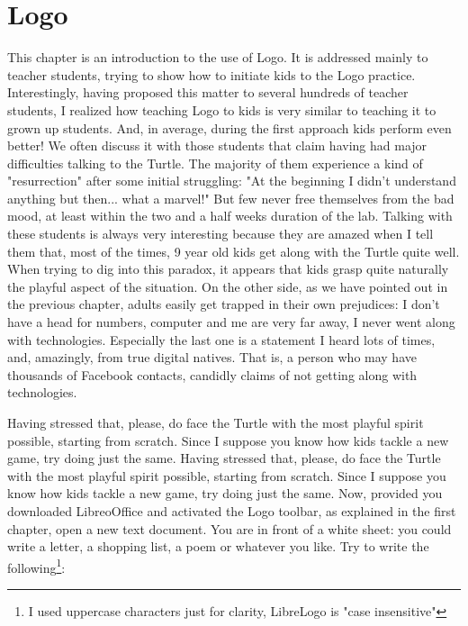 \chapter{Logo} \label{cap:papert2}

This chapter is an introduction to the use of Logo. It is addressed mainly to teacher students, trying to show how to initiate kids to the Logo practice. Interestingly, having proposed this matter to several hundreds of teacher students,  I realized how teaching Logo to kids is very similar to teaching it to grown up students. And, in average, during the first approach kids perform even better! We often discuss it with those students that claim having had major difficulties talking to the Turtle. The majority of them experience a kind of "resurrection" after some initial struggling: "At the beginning I didn't understand anything but then... what a marvel!"  But few never free themselves from the bad mood, at least within the two and a half weeks duration of the lab. Talking with these students is always very interesting because they are amazed when I tell them that, most of the times, 9 year old kids get along with the Turtle quite well. When trying to dig into this paradox, it appears that kids grasp quite naturally the playful aspect of the situation. On the other side, as we have pointed out in the previous chapter, adults easily get trapped in their own prejudices: I don't have a head for numbers, computer and me are very far away, I never went along with technologies. Especially the last one is a statement I heard lots of times, and, amazingly, from true digital natives. That is, a person who may have thousands of Facebook contacts, candidly claims of not getting along with technologies.

Having stressed that, please, do face the Turtle with the most playful spirit possible, starting from scratch. Since I suppose you know how kids tackle a new game, try doing just the same. Having stressed that, please, do face the Turtle with the most playful spirit possible, starting from scratch. Since I suppose you know how kids tackle a new game, try doing just the same.  Now, provided you downloaded LibreoOffice and activated the Logo toolbar, as explained in the first chapter, open a new text document. You are in front of a white sheet: you could write a letter, a shopping list, a poem or whatever you like. Try to write the following\footnote{I used uppercase characters just for clarity, LibreLogo is "case insensitive"}:

\vskip 1cm

